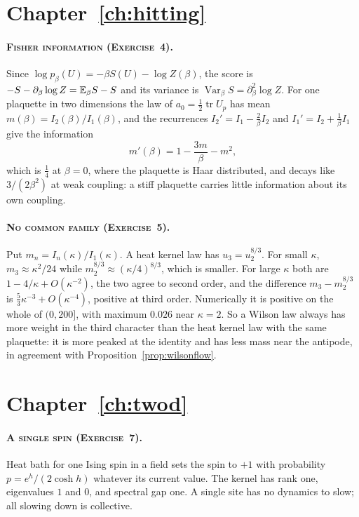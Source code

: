 \section*{Chapter~\ref{ch:hitting}}

\paragraph{\normalfont\scshape Fisher information (Exercise~4).} Since $\log p_\beta(U)=-\beta S(U)-\log Z(\beta)$, the score is $-S-\partial_\beta\log Z=\mathbb{E}_\beta S-S$ and its variance is $\operatorname{Var}_\beta S=\partial_\beta^2\log Z$. For one plaquette in two dimensions the law of $a_0=\frac12\operatorname{tr}U_p$ has mean $m(\beta)=I_2(\beta)/I_1(\beta)$, and the recurrences $I_2'=I_1-\frac2\beta I_2$ and $I_1'=I_2+\frac1\beta I_1$ give the information
\[
m'(\beta)=1-\frac{3m}{\beta}-m^2 ,
\]
which is $\frac14$ at $\beta=0$, where the plaquette is Haar distributed, and decays like $3/(2\beta^2)$ at weak coupling: a stiff plaquette carries little information about its own coupling.

\paragraph{\normalfont\scshape No common family (Exercise~5).} Put $m_n=I_n(\kappa)/I_1(\kappa)$. A heat kernel law has $u_3=u_2^{8/3}$. For small $\kappa$, $m_3\approx\kappa^2/24$ while $m_2^{8/3}\approx(\kappa/4)^{8/3}$, which is smaller. For large $\kappa$ both are $1-4/\kappa+O(\kappa^{-2})$, the two agree to second order, and the difference $m_3-m_2^{8/3}$ is $\frac53\kappa^{-3}+O(\kappa^{-4})$, positive at third order. Numerically it is positive on the whole of $(0,200]$, with maximum $0.026$ near $\kappa=2$. So a Wilson law always has more weight in the third character than the heat kernel law with the same plaquette: it is more peaked at the identity and has less mass near the antipode, in agreement with Proposition~\ref{prop:wilsonflow}.

\section*{Chapter~\ref{ch:twod}}

\paragraph{\normalfont\scshape A single spin (Exercise~7).} Heat bath for one Ising spin in a field sets the spin to $+1$ with probability $p=e^h/(2\cosh h)$ whatever its current value. The kernel has rank one, eigenvalues $1$ and $0$, and spectral gap one. A single site has no dynamics to slow; all slowing down is collective.

